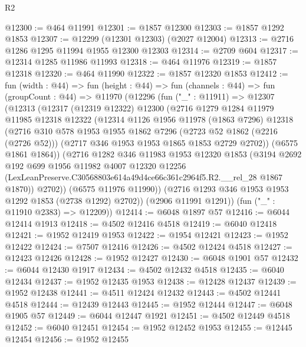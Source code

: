 \begin{lexlean}{R2}
\begin{coremodule}
@12300 := @464 @11991
@12301 := @1857 @12300
@12303 := @1857 @1292 @1853
@12307 := @12299 (@12301 @12303) (@2027 @12004)
@12313 := @2716 @1286 @1295 @11994 @1955 @12300 @12303
@12314 := @2709 @604
@12317 := @12314 @1285 @11986 @11993
@12318 := @464 @11976
@12319 := @1857 @12318
@12320 := @464 @11990
@12322 := @1857 @12320 @1853
@12412 := fun (width : @44) =>
  fun (height : @44) =>
  fun (channels : @44) =>
  fun (groupCount : @44) =>
  @11970
    (@12296
      (fun ("_" : @11911) =>
      @12307
        (@12313
          (@12317
            (@12319 @12322)
            @12300
            (@2716
              @1279
              @1284
              @11979
              @11985
              @12318
              @12322
              (@12314
                @1126
                @1956
                @11978
                (@1863 @7296)
                @12318
                (@2716
                  @310
                  @578
                  @1953
                  @1955
                  @1862
                  @7296
                  (@2723 @52 @1862 (@2216 (@2726 @52)))
                  (@2717 @346 @1953 @1953 @1865 @1853 @2729 @2702))
                (@6575 @1861 @1864))
              (@2716
                @1282
                @346
                @11983
                @1953
                @12320
                @1853
                (@3194
                  @2692
                  @192
                  @699
                  @1956
                  @11982
                  @4007
                  @12320
                  @12256
                  (LexLeanPreserve.C30568803e614a49d4ce66c361c2964f5.R2.__rel_28 @1867 @1870))
                @2702))
            (@6575 @11976 @11990))
          (@2716 @1293 @346 @1953 @1953 @1292 @1853 (@2738 @1292) @2702))
        (@2906 @11991 @1291))
      (fun ("_" : @11910 @2383) => @12209))
@12414 := @6048 @1897 @57
@12416 := @6044 @12414 @1913
@12418 := @4502 @12416 @4518
@12419 := @6040 @12418
@12421 := @1952 @12419 @1953
@12422 := @1954 @12421
@12423 := @1952 @12422
@12424 := @7507 @12416
@12426 := @4502 @12424 @4518
@12427 := @12423 @12426
@12428 := @1952 @12427
@12430 := @6048 @1901 @57
@12432 := @6044 @12430 @1917
@12434 := @4502 @12432 @4518
@12435 := @6040 @12434
@12437 := @1952 @12435 @1953
@12438 := @12428 @12437
@12439 := @1952 @12438
@12441 := @4511 @12424 @12432
@12443 := @4502 @12441 @4518
@12444 := @12439 @12443
@12445 := @1952 @12444
@12447 := @6048 @1905 @57
@12449 := @6044 @12447 @1921
@12451 := @4502 @12449 @4518
@12452 := @6040 @12451
@12454 := @1952 @12452 @1953
@12455 := @12445 @12454
@12456 := @1952 @12455

\end{coremodule}
\end{lexlean}
